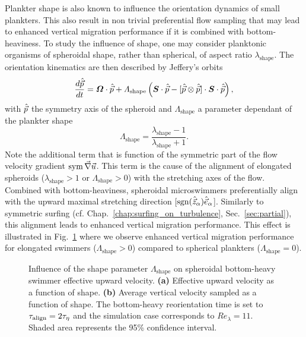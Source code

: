 Plankter shape is also known to influence the orientation dynamics of small plankters.
This also result in non trivial preferential flow sampling that may lead to enhanced vertical migration performance if it is combined with bottom-heaviness.
To study the influence of shape, one may consider planktonic organisms of spheroidal shape, rather than spherical, of aspect ratio $\lambda_{\mathrm{shape}}$.
The orientation kinematics are then described by Jeffery's orbits \citep{jeffery_motion_1922}
\begin{equation}
    \frac{d \hat{\vec{p}}}{dt} = \boldsymbol{\varOmega} \cdot \hat{\vec{p}} + \varLambda_{\mathrm{shape}} \left( \boldsymbol{S} \cdot \hat{\vec{p}} - [\hat{\vec{p}} \otimes \hat{\vec{p}}] \cdot \boldsymbol{S} \cdot \hat{\vec{p}} \right),
\end{equation}
with $\hat{\vec{p}}$ the symmetry axis of the spheroid and $\varLambda_{\mathrm{shape}}$ a parameter dependant of the plankter shape
\begin{equation}\label{eq:shape_factor}
	\varLambda_{\mathrm{shape}} = \frac{\lambda_{\mathrm{shape}} - 1}{\lambda_{\mathrm{shape}} + 1}.
\end{equation}
Note the additional term that is function of the symmetric part of the flow velocity gradient $\operatorname{sym} \vec{\nabla} \vec{u}$.
This term is the cause of the alignment of elongated spheroids ($\lambda_{\mathrm{shape}} > 1$ or $\varLambda_{\mathrm{shape}} > 0$) with the stretching axes of the flow.
Combined with bottom-heaviness, spheroidal microswimmers preferentially align with the upward maximal stretching direction [$\operatorname{sgn}(\hat{\vec{z}}_\alpha) \hat{\vec{e}}_{\alpha}$].
Similarly to symmetric surfing (cf. Chap.~\ref{chap:surfing_on_turbulence}, Sec.~\ref{sec:partial}), this alignment leads to enhanced vertical migration performance.
This effect is illustrated in Fig.~\ref{fig:passive_shape} where we observe enhanced vertical migration performance for elongated swimmers ($\varLambda_{\mathrm{shape}} > 0$) compared to spherical plankters ($\varLambda_{\mathrm{shape}} = 0$).
\begin{figure}%
	\centering
	
	\caption[Influence of the shape parameter $\varLambda_{\mathrm{shape}}$ on spheroidal bottom-heavy swimmer effective upward velocity.]{
		Influence of the shape parameter $\varLambda_{\mathrm{shape}}$ on spheroidal bottom-heavy swimmer effective upward velocity.
		\textbf{(a)} Effective upward velocity as a function of shape.
		\textbf{(b)} Average vertical velocity sampled as a function of shape.
		The bottom-heavy reorientation time is set to $\tau_{\mathrm{align}} = 2 \tau_{\eta}$ and the simulation case corresponds to $\mathit{Re}_{\lambda} = 11$.
		Shaded area represents the 95\% confidence interval.
	}
	\label{fig:passive_shape}
\end{figure}

